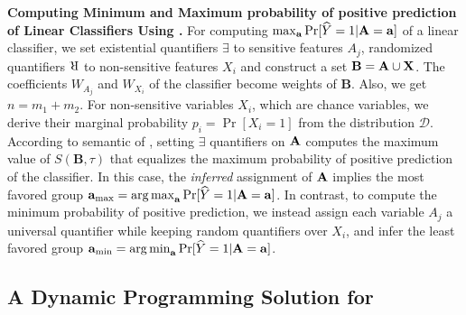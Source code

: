 \textbf{Computing Minimum and Maximum probability of positive prediction of Linear Classifiers Using  {\stochastic}.} For computing $ \max_{ \mathbf{a}} \Pr[\widehat{Y} =1 | \mathbf{A} = \mathbf{a}] $ of a linear classifier, we set existential quantifiers $ \exists $ to sensitive features $ A_j $, randomized quantifiers $ \R $ to non-sensitive features $ X_i $ and construct a set $ \mathbf{B} = \mathbf{A} \cup \mathbf{X} $.  The coefficients $ W_{A_j} $ and $ W_{X_i} $ of the classifier become weights of $ \mathbf{B} $. Also, we get $n=m_1 +m_2$. For non-sensitive variables $ X_i $, which are chance variables, we derive their marginal probability $ p_i = \Pr[X_i = 1] $ from the distribution $ \mathcal{D} $.  According to semantic of {\stochastic}, setting $ \exists $ quantifiers on $ \mathbf{A} $ computes the maximum value of $ S(\mathbf{B}, \tau) $ that equalizes the maximum probability of positive prediction of the classifier. In this case, the \textit{inferred} assignment of $ \mathbf{A} $ implies the most favored group $ \mathbf{a}_{{\max}} =  \operatorname*{arg\,max}_{ \mathbf{a}} \Pr[\widehat{Y} =1 | \mathbf{A} = \mathbf{a}] $. In contrast, to compute the minimum probability of positive prediction, we instead assign each variable  $ A_j $ a universal  quantifier  while keeping random quantifiers over $ X_i $, and infer the least favored group $ \mathbf{a}_{{\min}} =  \operatorname*{arg\,min}_{ \mathbf{a}} \Pr[\widehat{Y} =1 | \mathbf{A} = \mathbf{a}] $.

\iffalse
\red{The decision version of computing the maximum (minimum) \red{\red{probability of positive prediction}} is to decide whether there is an assignment of \textit{sensitive} or \textit{choice variables}, for which the \textit{non-sensitive} or \textit{chance variables} yield a \red{\red{probability of positive prediction}} greater or less than $\alpha \in [0,1]$. Now, we formally state the hardness of verifying linear classifiers followed by an efficient dynamic programming solution.
\begin{lemma}
	\label{fvgm_lm:hardness}
	The decision version of the fairness verification problem for linear classifiers is in $\mathrm{NP^{PP}}$.
\end{lemma}}
\fi

 
 
 \subsection{A Dynamic Programming Solution for {\stochastic}}
 \label{fvgm_sec:dp_formulation}

